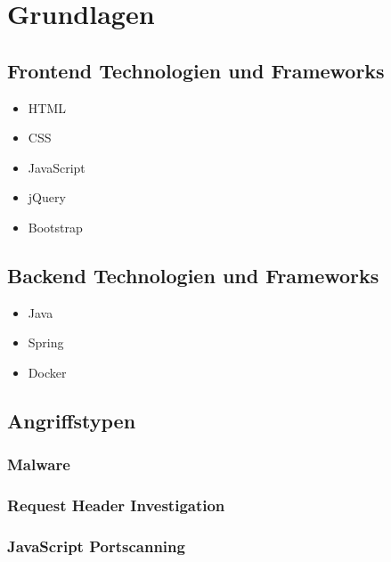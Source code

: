 \chapter{Grundlagen}

\section{Frontend Technologien und Frameworks}

\begin{itemize}
    \item HTML
    \item CSS
    \item JavaScript
    \item jQuery
    \item Bootstrap
\end{itemize}

\section{Backend Technologien und Frameworks}

\begin{itemize}
    \item Java
    \item Spring
    \item Docker
\end{itemize}

\section{Angriffstypen}

\subsection{Malware}

\subsection{Request Header Investigation}

\subsection{JavaScript Portscanning}
